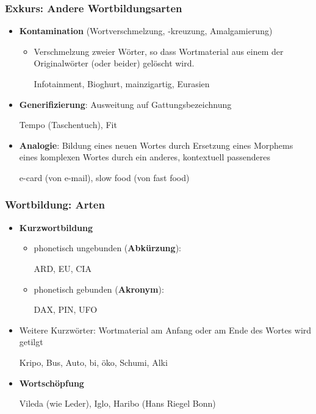 \begin{frame}
\frametitle{Exkurs: Andere Wortbildungsarten}

\begin{itemize}
	\item \textbf{Kontamination} (Wortverschmelzung, -kreuzung, Amalgamierung)
	
	\begin{itemize}
		\item Verschmelzung zweier Wörter, so dass Wortmaterial aus einem der Originalwörter (oder beider) gelöscht wird.
		
		\ea Infotainment, Bioghurt, mainzigartig, Eurasien
		\z
	\end{itemize}
	
	\item \textbf{Generifizierung}: Ausweitung auf Gattungsbezeichnung
	
	\ea Tempo (Taschentuch), Fit
	\z
	
	\item \textbf{Analogie}: Bildung eines neuen Wortes durch Ersetzung eines Morphems eines komplexen Wortes durch ein anderes, kontextuell passenderes
	
	\ea e-card (von e-mail), slow food (von fast food)
	\z
	
\end{itemize}

\end{frame}


\begin{frame}
\frametitle{Wortbildung: Arten}

\begin{itemize}
\item \textbf{Kurzwortbildung}

\begin{itemize}
	\item phonetisch ungebunden (\textbf{Abkürzung}):
	
	\ea ARD, EU, CIA
	\z
	
	\item phonetisch gebunden (\textbf{Akronym}):
	
	\ea DAX, PIN, UFO
	\z
	
\end{itemize}

\item Weitere Kurzwörter: Wortmaterial am Anfang oder am Ende des Wortes wird getilgt

\ea Kripo, Bus, Auto, bi, öko, Schumi, Alki
\z

\item \textbf{Wortschöpfung}

\ea Vileda (wie Leder), Iglo, Haribo (Hans Riegel Bonn)
\z

\end{itemize}

\end{frame}


